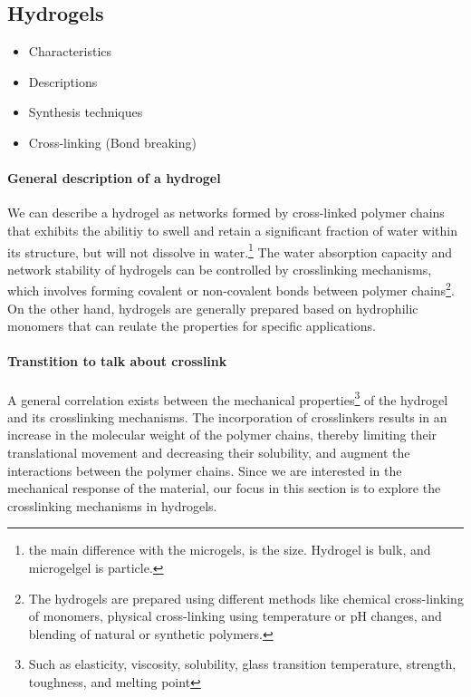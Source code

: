 \subsection{Hydrogels}\label{ch1:Hydrogels}

\begin{itemize}
    \item Characteristics
    \item Descriptions 
    \item Synthesis techniques
    \item Cross-linking (Bond breaking)
\end{itemize}


\paragraph{General description of a hydrogel}
We can describe a hydrogel as networks formed by cross-linked polymer chains that exhibits the abilitiy to swell and retain a significant fraction of water within its structure, but will not dissolve in water\citep{ahmedHydrogelPreparationCharacterization2015a,ahmedHydrogelsMicrogelsDriving2025,priyaComprehensiveReviewHydrogel2024}.\footnote{the main difference with the microgels, is the size. Hydrogel is bulk, and microgelgel is particle.}
The water absorption capacity and network stability of hydrogels can be controlled by crosslinking mechanisms, which involves forming covalent or non-covalent bonds between polymer chains\footnote{The hydrogels are prepared using different methods like chemical cross-linking of monomers, physical cross-linking using temperature or pH changes, and blending of natural or synthetic polymers.}\citep{priyaComprehensiveReviewHydrogel2024,ahmedHydrogelPreparationCharacterization2015a}. 
On the other hand, hydrogels are generally prepared based on hydrophilic monomers that can reulate the properties for specific applications\citep{ahmedHydrogelPreparationCharacterization2015a,priyaComprehensiveReviewHydrogel2024}.

\paragraph{Transtition to talk about crosslink}
A general correlation exists between the mechanical properties\footnote{Such as elasticity, viscosity, solubility, glass transition temperature, strength, toughness, and melting point\citep{priyaComprehensiveReviewHydrogel2024}} of the hydrogel and its crosslinking mechanisms.
The incorporation of crosslinkers results in an increase in the molecular weight of the polymer chains, thereby limiting their translational movement and decreasing their solubility, and augment the interactions between the polymer chains\citep{priyaComprehensiveReviewHydrogel2024}.
Since we are interested in the mechanical response of the material, our focus in this section is to explore the crosslinking mechanisms in hydrogels.


